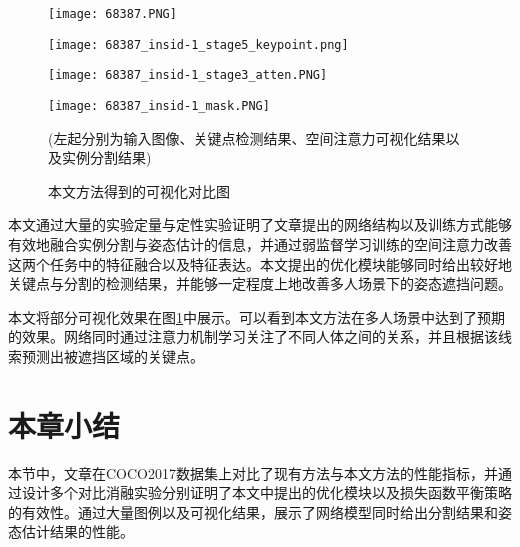 \begin{figure}[htbp]
\begin{minipage}[t]{\linewidth}
		\vskip5pt
		\begin{minipage}[t]{0.23\linewidth}
			\texttt{[image: 68387.PNG]}
		\end{minipage}
		\begin{minipage}[t]{0.23\linewidth}
			\texttt{[image: 68387\_insid-1\_stage5\_keypoint.png]}
		\end{minipage}
		\begin{minipage}[t]{0.23\linewidth}
			\texttt{[image: 68387\_insid-1\_stage3\_atten.PNG]}
		\end{minipage}
		\begin{minipage}[t]{0.23\linewidth}
			\texttt{[image: 68387\_insid-1\_mask.PNG]}
		\end{minipage}
	\end{minipage}
	\caption{本文方法得到的可视化对比图}
	\begin{minipage}{\linewidth}
	\centering
	\wuhao
	(左起分别为输入图像、关键点检测结果、空间注意力可视化结果以及实例分割结果)
	\end{minipage}
	\label{fig:megavis}
\end{figure}

本文通过大量的实验定量与定性实验证明了文章提出的网络结构以及训练方式能够有效地融合实例分割与姿态估计的信息，并通过弱监督学习训练的空间注意力改善这两个任务中的特征融合以及特征表达。本文提出的优化模块能够同时给出较好地关键点与分割的检测结果，并能够一定程度上地改善多人场景下的姿态遮挡问题。

本文将部分可视化效果在图\ref{fig:megavis}中展示。可以看到本文方法在多人场景中达到了预期的效果。网络同时通过注意力机制学习关注了不同人体之间的关系，并且根据该线索预测出被遮挡区域的关键点。



\section{本章小结}
本节中，文章在COCO2017数据集上对比了现有方法与本文方法的性能指标，并通过设计多个对比消融实验分别证明了本文中提出的优化模块以及损失函数平衡策略的有效性。通过大量图例以及可视化结果，展示了网络模型同时给出分割结果和姿态估计结果的性能。